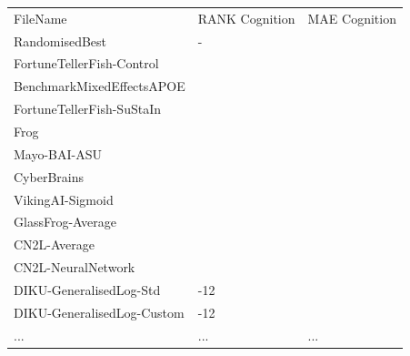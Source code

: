 \documentclass[8pt,xcolor=table,aspectratio=169]{beamer}
\begin{document}
\begin{frame}
\begin{columns}[t]
\begin{column}[t]{0.4\textwidth}
\begin{table}
 \fontsize{6}{8}\selectfont
\begin{tabular}{l|>{\centering\arraybackslash}m{1cm}|>{\centering\arraybackslash}m{1cm}}
 \Xhline{2.5\arrayrulewidth}
                     FileName & RANK Cognition &  MAE Cognition\\
 \Xhline{2.5\arrayrulewidth}
     \rowcolor{randomCol}   RandomisedBest            &         - &      4.52  \\
    FortuneTellerFish-Control &         1 &      4.70 \\
 \rowcolor{benchmarkCol} BenchmarkMixedEffectsAPOE &         2 &      4.75 \\
    FortuneTellerFish-SuStaIn &         3 &      4.81 \\
                         Frog &         4 &      4.85 \\
                 Mayo-BAI-ASU &         5 &      4.98 \\
                  CyberBrains &         6 &      5.16  \\
             VikingAI-Sigmoid &         7 &      5.20  \\
            GlassFrog-Average &         8 &      5.26  \\
                 CN2L-Average &         9 &      5.31 \\
           CN2L-NeuralNetwork &        10 &      5.36  \\
      DIKU-GeneralisedLog-Std &     11-12 &      5.40  \\
   DIKU-GeneralisedLog-Custom &     11-12 &      5.40  \\
                         ...  &       ... &      ...      \\

\end{tabular}
\end{table}
\end{column}
\end{columns}
\end{frame}
\end{document}
